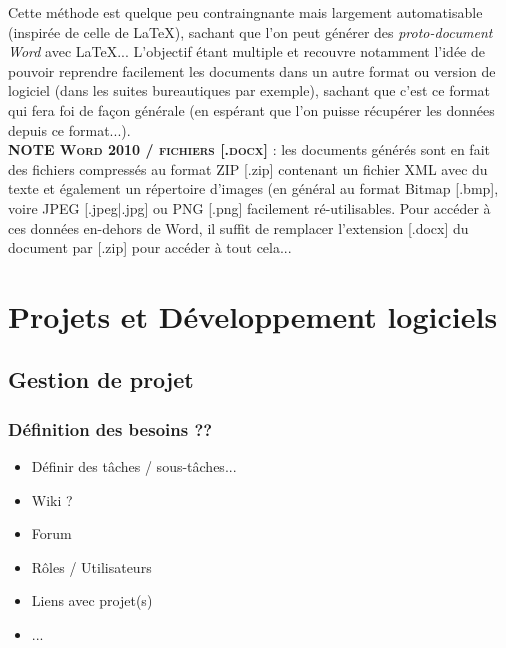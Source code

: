 \documentclass[11pt,twoside,a4paper]{article}
\begin{document}
Cette m{\'e}thode est quelque peu contraingnante mais largement automatisable (inspir{\'e}e de celle de \LaTeX), sachant que l'on peut g{\'e}n{\'e}rer des \emph{proto-document Word} avec \LaTeX ... L'objectif {\'e}tant multiple et recouvre notamment l'id{\'e}e de pouvoir reprendre facilement les documents dans un autre format ou version de logiciel (dans les suites bureautiques par exemple), sachant que c'est ce format qui fera foi de fa\c{c}on g{\'e}n{\'e}rale (en esp{\'e}rant que l'on puisse r{\'e}cup{\'e}rer les donn{\'e}es depuis ce format...).~\\

\textsc{\textbf{NOTE Word 2010 / fichiers [.docx]}} : les documents g{\'e}n{\'e}r{\'e}s sont en fait des fichiers compress{\'e}s au format ZIP [.zip] contenant un fichier XML avec du texte et {\'e}galement un r{\'e}pertoire d'images (en g{\'e}n{\'e}ral au format Bitmap [.bmp], voire JPEG [.jpeg|.jpg] ou PNG [.png] facilement r{\'e}-utilisables. Pour acc{\'e}der {\`a} ces donn{\'e}es en-dehors de Word, il suffit de remplacer l'extension [.docx] du document par [.zip] pour acc{\'e}der {\`a} tout cela...


\clearpage

\section{Projets et D{\'e}veloppement logiciels}

\subsection{Gestion de projet}

\subsubsection{D{\'e}finition des besoins ??}

\begin{itemize}
	\item D{\'e}finir des t{\^a}ches / sous-t{\^a}ches...
	\item Wiki ?
	\item Forum
	\item R{\^o}les / Utilisateurs
	\item Liens avec projet(s)
	\item ...
\end{itemize}
\end{document}
